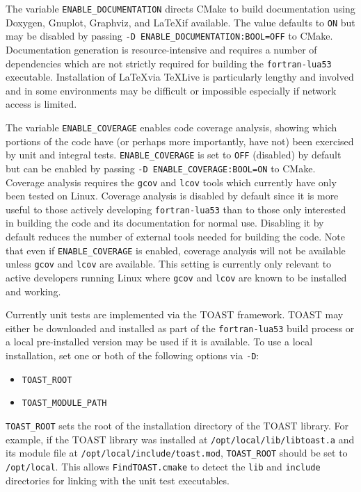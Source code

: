 The variable \texttt{ENABLE\_DOCUMENTATION} directs CMake to build
documentation using Doxygen, Gnuplot, Graphviz, and \LaTeX if available.
The value defaults to \texttt{ON} but may be disabled by passing
\texttt{-D ENABLE\_DOCUMENTATION:BOOL=OFF} to CMake. Documentation
generation is resource-intensive and requires a number of dependencies
which are not strictly required for building the \texttt{fortran-lua53} executable.
Installation of \LaTeX via TeXLive is particularly lengthy and involved
and in some environments may be difficult or impossible especially if
network access is limited.

The variable \texttt{ENABLE\_COVERAGE} enables code coverage analysis,
showing which portions of the code have (or perhaps more importantly,
have not) been exercised by unit and integral tests.
\texttt{ENABLE\_COVERAGE} is set to \texttt{OFF} (disabled) by default
but can be enabled by passing \texttt{-D ENABLE\_COVERAGE:BOOL=ON} to
CMake. Coverage analysis requires the \texttt{gcov} and \texttt{lcov}
tools which currently have only been tested on Linux. Coverage analysis
is disabled by default since it is more useful to those actively
developing \texttt{fortran-lua53} than to those only interested in building the
code and its documentation for normal use. Disabling it by default
reduces the number of external tools needed for building the code. Note
that even if \texttt{ENABLE\_COVERAGE} is enabled, coverage analysis
will not be available unless \texttt{gcov} and \texttt{lcov} are
available. This setting is currently only relevant to active developers
running Linux where \texttt{gcov} and \texttt{lcov} are known to be
installed and working.

Currently unit tests are implemented via the TOAST framework. TOAST
may either be downloaded and installed as part of the \texttt{fortran-lua53} build
process or a local pre-installed version may be used if it is available.
To use a local installation, set one or both of the following options
via \texttt{-D}:

\begin{itemize}
    \item \texttt{TOAST\_ROOT}
    \item \texttt{TOAST\_MODULE\_PATH}
\end{itemize}

\texttt{TOAST\_ROOT} sets the root of the installation directory of the
TOAST library. For example, if the TOAST library was installed at
\texttt{/opt/local/lib/libtoast.a} and its module file at
\texttt{/opt/local/include/toast.mod}, \texttt{TOAST\_ROOT} should be
set to \texttt{/opt/local}. This allows \texttt{FindTOAST.cmake} to
detect the \texttt{lib} and \texttt{include} directories for linking
with the unit test executables.

